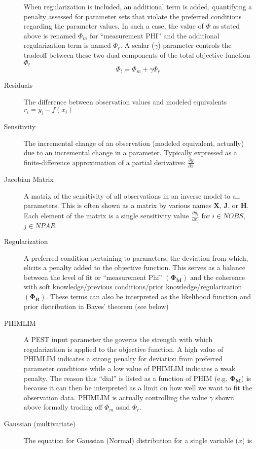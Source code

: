 \documentclass[english]{article}
\begin{document}
\begin{description}
When regularization is included, an additional term is added, quantifying a penalty assessed for parameter sets that violate the preferred conditions regarding the parameter values. In such a case, the value of $\Phi$ as stated above is renamed $\Phi_m$ for ``measurement PHI'' and the additional regularization term is named $\Phi_r$. A scalar ($\gamma$) parameter controls the tradeoff between these two dual components of the total objective function $\Phi_t$
\begin{equation}
\Phi_t = \Phi_m + \gamma \Phi_r
\end{equation}

\item [Residuals] The difference between observation values and modeled equivalents $r_i=y_i-f\left(x_i\right)$
\item [Sensitivity] The incremental change of an observation (modeled equivalent, actually) due to an incremental change in a parameter. Typically expressed as a finite-difference approximation of a partial derivative: $\frac{\partial y}{\partial x}$
\item [Jacobian Matrix] A matrix of the sensitivity of all observations in an inverse model to all parameters. This is often shown as a matrix by various names $\mathbf{X}$, $\mathbf{J}$, or $\mathbf{H}$. Each element of the matrix is a single sensitivity value  $\frac{\partial y_i}{\partial x_j}$ for $i\in NOBS$, $j \in NPAR$
\item [Regularization] A preferred condition pertaining to parameters, the deviation from which, elicits a penalty added to the objective function. This serves as a balance between the level of fit or ``measurement Phi''  $(\mathbf{\Phi_M})$ and the coherence with soft knowledge/previous conditions/prior knowledge/regularization $(\mathbf{\Phi_R})$. These terms can also be interpreted as the likelihood function and prior distribution in Bayes' theorem (see below) 
\item [PHIMLIM] A PEST input parameter the governs the strength with which regularization is applied to the objective function. A high value of PHIMLIM indicates a strong penalty for deviation from preferred parameter conditions while a low value of PHIMLIM indicates a weak penalty. The reason this ``dial'' is listed as a function of PHIM (e.g. $\mathbf{\Phi_M}$) is because it can then be interpreted as a limit on how well we want to fit the observation data. PHIMLIM is actually controlling the value $\gamma$ shown above formally trading off $\Phi_m$ asnd $\Phi_r$.
\item [Gaussian (multivariate)] The equation for Gaussian (Normal) distribution for a single variable ($x$) is 

\end{description}
\end{document}
